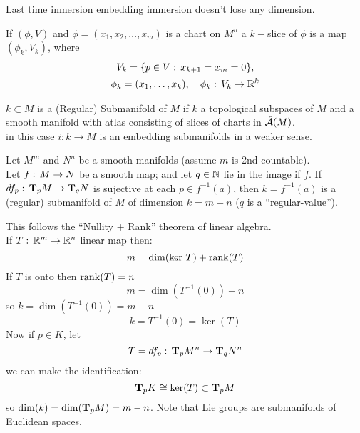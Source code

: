 Last time inmersion embedding immersion doesn't lose any dimension.
\begin{ddef}
If $(\phi,V)$ and $\phi=(x_1,x_2,\ldots, x_m)$ is a chart on $M^n$ a $k-$slice of $\phi$ is a map $(\phi_k,V_k)$, where
\begin{gather*}
V_k = \{p\in V:\, x_{k+1} = x_m =0\},\\
\phi_k=(x_1,\ldots, x_k),\quad \phi_k:\, V_k \to \mathbb{R}^k
\end{gather*}
\end{ddef}

\begin{ddef}
$k\subset M$ is a (Regular) Submanifold of $M$ if $k$ a topological subspaces of $M$ and a smooth manifold with atlas consisting of slices of charts in $\hat {\mathcal{A}}(M)$.\\
in this case $i: k\to M$ is an embedding submanifolds in a weaker sense.
\end{ddef}

\begin{teorema}
Let $M^m$ and $N^n$ be a smooth manifolds (assume $m$ is 2nd countable).\\
Let $f:\, M\to N$ be a smooth map; and  let $q\in \mathbb{N}$ lie in the image if $f$. If $df_p :\, \text{\textbf{T}}_pM \to \text{\textbf{T}}_qN$ is sujective at each $p\in f ^{-1} (a)$, then $k= f ^{-1} (a)$ is a (regular) submanifold of $M$ of dimension $k=m-n$ ($q$ is a ``regular-value'').
\end{teorema}

\begin{remarks}
This follows the ``Nullity + Rank'' theorem of linear algebra.\\
If $T:\, \mathbb{R}^m \to \mathbb{R}^n$ linear map then:
$$m=\dim(\ker\,T) + \operatorname{rank}(T)$$
If $T$ is onto then $\operatorname{rank}(T)=n$
$$m=\dim(T ^{-1} (0)) + n$$
so $k=\dim(T ^{-1} (0)) = m-n$
$$k=T ^{-1} (0) = \ker(T)$$
Now if $p\in K$, let 
$$T=df_p :\, \text{\textbf{T}}_pM^n \to \text{\textbf{T}}_qN^n$$
we can make the identification:
$$\text{\textbf{T}}_pK \cong \ker(T) \subset \text{\textbf{T}}_pM$$
so $\dim(k)= \dim(\text{\textbf{T}}_pM) = m-n$. Note that Lie groups are submanifolds of Euclidean spaces.
\end{remarks} 

